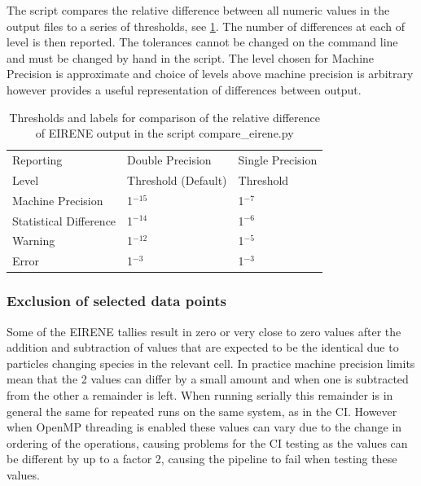 The script compares the relative difference between all numeric values in the output files to a series of thresholds, see \cref{tab:compareThresh}. The number of differences at each of level is then reported. The tolerances cannot be changed on the command line and must be changed by hand in the script. The level chosen for Machine Precision is approximate and choice of levels above machine precision is arbitrary however provides a useful representation of differences between output.

\begin{table}
  \begin{center}
    \begin{tabular}{ | p{4cm} | p{4cm} | p{4cm} |  }
      \hline
      Reporting  &  Double Precision  & Single Precision \\
      Level      &  Threshold (Default) & Threshold \\
      \hline
      Machine Precision       &  1$^{-15}$  &  1$^{-7}$ \\
      Statistical Difference  &  1$^{-14}$  &  1$^{-6}$ \\
      Warning                 &  1$^{-12}$  &  1$^{-5}$ \\
      Error                   &  1$^{-3}$   &  1$^{-3}$ \\
      \hline
    \end{tabular}
    \caption{Thresholds and labels for comparison of the relative difference of EIRENE output in the script compare\_eirene.py \label{tab:compareThresh}}
  \end{center}
\end{table}

\subsubsection{Exclusion of selected data points}
Some of the EIRENE tallies result in zero or very close to zero values after the addition and subtraction of values that are expected to be the identical due to particles changing species in the relevant cell. In practice machine precision limits mean that the 2 values can differ by a small amount and when one is subtracted from the other a remainder is left. When running serially this remainder is in general the same for repeated runs on the same system, as in the CI. However when OpenMP threading is enabled these values can vary due to the change in ordering of the operations, causing problems for the CI testing as the values can be different by up to a factor 2, causing the pipeline to fail when testing these values.

